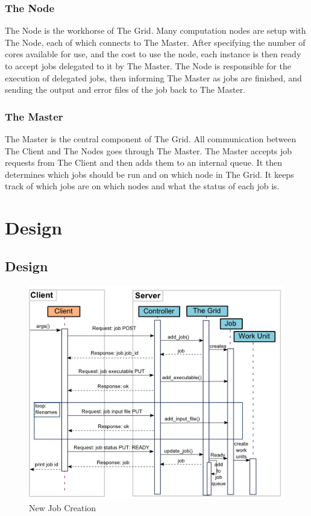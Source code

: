 \section{The Node}
\label{thenode}

The Node is the workhorse of The Grid. Many computation nodes are setup with The Node, each of which connects to The Master. After specifying the number of cores available for use, and the cost to use the node, each instance is then ready to accept jobs delegated to it by The Master. The Node is responsible for the execution of delegated jobs, then informing The Master as jobs are finished, and sending the output and error files of the job back to The Master.

\section{The Master}
\label{themaster}

The Master is the central component of The Grid. All communication between The Client and The Nodes goes through The Master. The Master accepts job requests from The Client and then adds them to an internal queue. It then determines which jobs should be run and on which node in The Grid. It keeps track of which jobs are on which nodes and what the status of each job is. 

\part{Design}
\label{design}

\chapter{Design}
\label{design}

\begin{figure}[htbp]
\centering
\includegraphics[keepaspectratio,width=\textwidth,height=0.75\textheight]{./figs/creation.png}
\caption{New Job Creation}
\end{figure}


